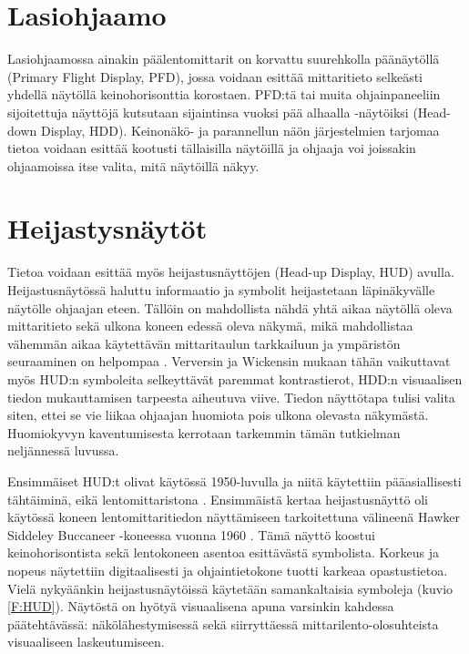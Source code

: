 \documentclass[utf8,bachelor,manualbib]{gradu3}
\begin{document}
\section{Lasiohjaamo}

Lasiohjaamossa ainakin päälentomittarit on korvattu suurehkolla päänäytöllä (Primary Flight Display, PFD), jossa voidaan esittää mittaritieto selkeästi yhdellä näytöllä keinohorisonttia korostaen. PFD:tä tai muita ohjainpaneeliin sijoitettuja näyttöjä kutsutaan sijaintinsa vuoksi pää alhaalla -näytöiksi (Head-down Display, HDD). Keinonäkö- ja parannellun näön järjestelmien tarjomaa tietoa voidaan esittää kootusti tällaisilla näytöillä ja ohjaaja voi joissakin ohjaamoissa itse valita, mitä näytöillä näkyy.

\section{Heijastysnäytöt}

Tietoa voidaan esittää myös heijastusnäyttöjen (Head-up Display, HUD) avulla. Heijastusnäytössä haluttu informaatio ja symbolit heijastetaan läpinäkyvälle näytölle ohjaajan eteen. Tällöin on mahdollista nähdä yhtä aikaa näytöllä oleva mittaritieto sekä ulkona koneen edessä oleva näkymä, mikä mahdollistaa vähemmän aikaa käytettävän mittaritaulun tarkkailuun ja ympäristön seuraaminen on helpompaa \citep{crawfordneal2006}. Verversin ja Wickensin \citeyearpar{ververswickens1998} mukaan tähän vaikuttavat myös HUD:n symboleita selkeyttävät paremmat kontrastierot, HDD:n visuaalisen tiedon mukauttamisen tarpeesta aiheutuva viive. Tiedon näyttötapa tulisi valita siten, ettei se vie liikaa ohjaajan huomiota pois ulkona olevasta näkymästä. Huomiokyvyn kaventumisesta kerrotaan tarkemmin tämän tutkielman neljännessä luvussa.

Ensimmäiset HUD:t olivat käytössä 1950-luvulla ja niitä käytettiin pääasiallisesti tähtäiminä, eikä lentomittaristona \citep{crawfordneal2006}. Ensimmäistä kertaa heijastusnäyttö oli käytössä koneen lentomittaritiedon näyttämiseen tarkoitettuna välineenä Hawker Siddeley Buccaneer -koneessa vuonna 1960 \citep{weintraubensing1992}. Tämä näyttö koostui keinohorisontista sekä lentokoneen asentoa esittävästä symbolista. Korkeus ja nopeus näytettiin digitaalisesti ja ohjaintietokone tuotti karkeaa opastustietoa. Vielä nykyäänkin heijastusnäytöissä käytetään samankaltaisia symboleja (kuvio \ref{F:HUD}). Näytöstä on hyötyä visuaalisena apuna varsinkin kahdessa päätehtävässä: näkölähestymisessä sekä siirryttäessä mittarilento-olosuhteista visuaaliseen laskeutumiseen. \citep{crawfordneal2006}
\end{document}
